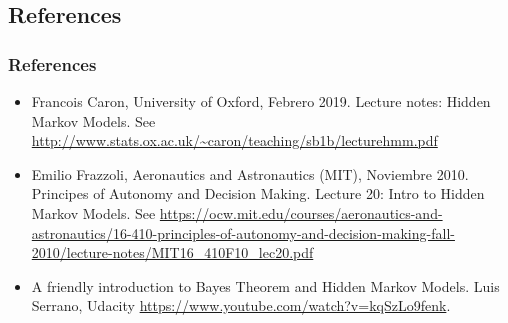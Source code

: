 \documentclass[xcolor=dvipsnames, compress]{beamer}
\begin{document}
\begin{frame}
\section{References}
\frametitle{References}
\begin{itemize}
	\item Francois Caron, University of Oxford, Febrero 2019. Lecture notes: Hidden Markov Models. See \url{http://www.stats.ox.ac.uk/~caron/teaching/sb1b/lecturehmm.pdf}
	\item Emilio Frazzoli, Aeronautics and Astronautics (MIT), Noviembre 2010. Principes of Autonomy and Decision Making. Lecture 20: Intro to Hidden Markov Models. See \url{https://ocw.mit.edu/courses/aeronautics-and-astronautics/16-410-principles-of-autonomy-and-decision-making-fall-2010/lecture-notes/MIT16_410F10_lec20.pdf}
	\item A friendly introduction to Bayes Theorem and Hidden Markov Models. Luis Serrano, Udacity \url{https://www.youtube.com/watch?v=kqSzLo9fenk}.
\end{itemize}
	
\end{frame}


%
 
 
\end{document}
